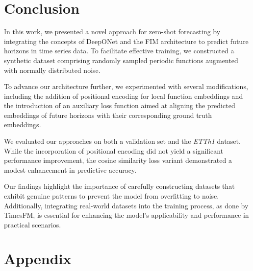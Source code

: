 \documentclass{article}
\theoremstyle{plain}
\theoremstyle{definition}
\theoremstyle{remark}
\begin{document}
\section{Conclusion}
In this work, we presented a novel approach for zero-shot forecasting by integrating the concepts of DeepONet and the FIM architecture to predict future horizons in time series data. To facilitate effective training, we constructed a synthetic dataset comprising randomly sampled periodic functions augmented with normally distributed noise.

To advance our architecture further, we experimented with several modifications, including the addition of positional encoding for local function embeddings and the introduction of an auxiliary loss function aimed at aligning the predicted embeddings of future horizons with their corresponding ground truth embeddings. 

We evaluated our approaches on both a validation set and the \emph{ETTh1} dataset. While the incorporation of positional encoding did not yield a significant performance improvement, the cosine similarity loss variant demonstrated a modest enhancement in predictive accuracy.

Our findings highlight the importance of carefully constructing datasets that exhibit genuine patterns to prevent the model from overfitting to noise. Additionally, integrating real-world datasets into the training process, as done by TimesFM, is essential for enhancing the model's applicability and performance in practical scenarios. 










\newpage
\appendix
\onecolumn
\section{Appendix}
\label{sec:appendix}
\end{document}

